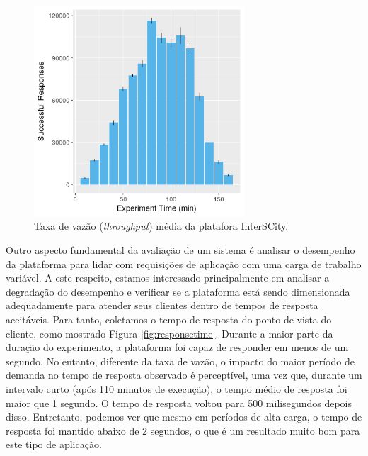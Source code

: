 \begin{figure}[ht]
	\centering
	\includegraphics[width=0.7\textwidth]{figuras/throughput.png}
    \caption{Taxa de vazão (\textit{throughput}) média da platafora InterSCity.}
	\label{fig:throughput}
\end{figure}


Outro aspecto fundamental da avaliação de um sistema é analisar o desempenho da plataforma para lidar com requisições de aplicação com uma carga de trabalho variável.
A este respeito, estamos interessado principalmente em analisar a degradação do desempenho e verificar se a plataforma está sendo dimensionada adequadamente para atender seus clientes dentro de tempos
de resposta aceitáveis.
Para tanto, coletamos o tempo de resposta do ponto de vista do cliente, como mostrado Figura \ref{fig:responsetime}.
Durante a maior parte da duração do experimento, a plataforma foi capaz de responder em menos de um segundo.
No entanto, diferente da taxa de vazão, o impacto do maior período de demanda no tempo de resposta observado é perceptível, uma vez que, durante um intervalo curto (após 110 minutos de execução),
o tempo médio de resposta foi maior que 1 segundo.
O tempo de resposta voltou para 500 milisegundos depois disso.
Entretanto, podemos ver que mesmo em períodos de alta carga, o tempo de resposta foi mantido abaixo de 2 segundos, o que é um resultado muito bom para este tipo de aplicação.

